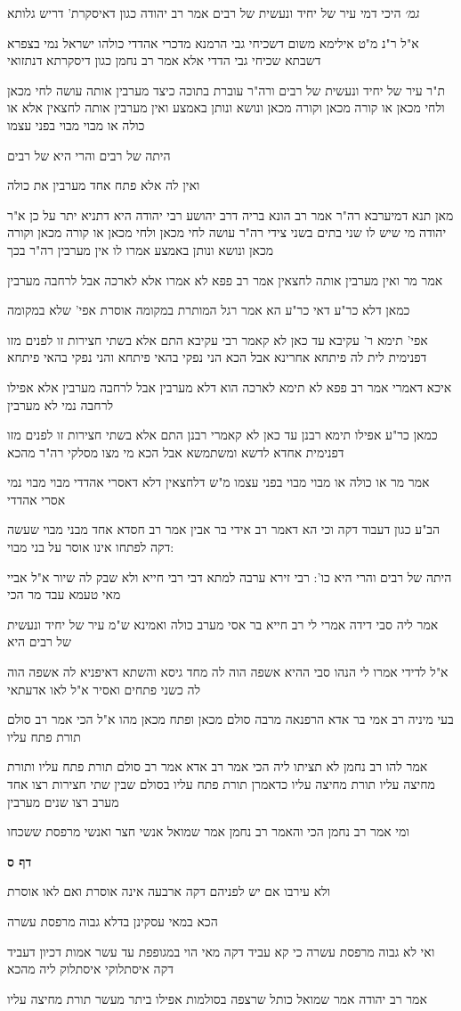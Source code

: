 \documentclass[12pt, openany]{book}
\newcommand{\sethebfont}{
\fontsize{10.5pt}{21.0pt} \selectfont
}
\newcommand{\textblock}[1]{
{\sethebfont #1\\}	
}
\newcommand{\sectname}{}
\newcommand{\newsection}[1]{
	\addcontentsline{toc}{section}{#1}
	\renewcommand{\sectname}{#1}	
	\vspace{-\baselineskip}
	\begin{center}
		\textbf{%
\fontsize{16pt}{16pt}\selectfont
			#1}
	\end{center}
	\vspace{-\baselineskip}
	\nopagebreak
}
\begin{document}
\textblock{{\large\emph{גמ׳}} היכי דמי עיר של יחיד ונעשית של רבים אמר רב יהודה כגון דאיסקרת' דריש גלותא}
\textblock{א"ל ר"נ מ"ט אילימא משום דשכיחי גבי הרמנא מדכרי אהדדי כולהו ישראל נמי בצפרא דשבתא שכיחי גבי הדדי אלא אמר רב נחמן כגון דיסקרתא דנתזואי}
\textblock{ת"ר עיר של יחיד ונעשית של רבים ורה"ר עוברת בתוכה כיצד מערבין אותה עושה לחי מכאן ולחי מכאן או קורה מכאן וקורה מכאן ונושא ונותן באמצע ואין מערבין אותה לחצאין אלא או כולה או מבוי מבוי בפני עצמו}
\textblock{היתה של רבים והרי היא של רבים}
\textblock{ואין לה אלא פתח אחד מערבין את כולה}
\textblock{מאן תנא דמיערבא רה"ר אמר רב הונא בריה דרב יהושע רבי יהודה היא דתניא יתר על כן א"ר יהודה מי שיש לו שני בתים בשני צידי רה"ר עושה לחי מכאן ולחי מכאן או קורה מכאן וקורה מכאן ונושא ונותן באמצע אמרו לו אין מערבין רה"ר בכך}
\textblock{אמר מר ואין מערבין אותה לחצאין אמר רב פפא לא אמרו אלא לארכה אבל לרחבה מערבין}
\textblock{כמאן דלא כר"ע דאי כר"ע הא אמר רגל המותרת במקומה אוסרת אפי' שלא במקומה}
\textblock{אפי' תימא ר' עקיבא עד כאן לא קאמר רבי עקיבא התם אלא בשתי חצירות זו לפנים מזו דפנימית לית לה פיתחא אחרינא אבל הכא הני נפקי בהאי פיתחא והני נפקי בהאי פיתחא}
\textblock{איכא דאמרי אמר רב פפא לא תימא לארכה הוא דלא מערבין אבל לרחבה מערבין אלא אפילו לרחבה נמי לא מערבין}
\textblock{כמאן כר"ע אפילו תימא רבנן עד כאן לא קאמרי רבנן התם אלא בשתי חצירות זו לפנים מזו דפנימית אחדא לדשא ומשתמשא אבל הכא מי מצו מסלקי רה"ר מהכא}
\textblock{אמר מר או כולה או מבוי מבוי בפני עצמו מ"ש דלחצאין דלא דאסרי אהדדי מבוי מבוי נמי אסרי אהדדי}
\textblock{הב"ע כגון דעבוד דקה וכי הא דאמר רב אידי בר אבין אמר רב חסדא אחד מבני מבוי שעשה דקה לפתחו אינו אוסר על בני מבוי:}
\textblock{היתה של רבים והרי היא כו': רבי זירא ערבה למתא דבי רבי חייא ולא שבק לה שיור א"ל אביי מאי טעמא עבד מר הכי}
\textblock{אמר ליה סבי דידה אמרי לי רב חייא בר אסי מערב כולה ואמינא ש"מ עיר של יחיד ונעשית של רבים היא}
\textblock{א"ל לדידי אמרו לי הנהו סבי ההיא אשפה הוה לה מחד גיסא והשתא דאיפניא לה אשפה הוה לה כשני פתחים ואסיר א"ל לאו אדעתאי}
\textblock{בעי מיניה רב אמי בר אדא הרפנאה מרבה סולם מכאן ופתח מכאן מהו א"ל הכי אמר רב סולם תורת פתח עליו}
\textblock{אמר להו רב נחמן לא תציתו ליה הכי אמר רב אדא אמר רב סולם תורת פתח עליו ותורת מחיצה עליו תורת מחיצה עליו כדאמרן תורת פתח עליו בסולם שבין שתי חצירות רצו אחד מערב רצו שנים מערבין}
\textblock{ומי אמר רב נחמן הכי והאמר רב נחמן אמר שמואל אנשי חצר ואנשי מרפסת ששכחו}
\newsection{דף ס}
\textblock{ולא עירבו אם יש לפניהם דקה ארבעה אינה אוסרת ואם לאו אוסרת}
\textblock{הכא במאי עסקינן בדלא גבוה מרפסת עשרה}
\textblock{ואי לא גבוה מרפסת עשרה כי קא עביד דקה מאי הוי במגופפת עד עשר אמות דכיון דעביד דקה איסתלוקי איסתלוק ליה מהכא}
\textblock{אמר רב יהודה אמר שמואל כותל שרצפה בסולמות אפילו ביתר מעשר תורת מחיצה עליו}
\end{document}
